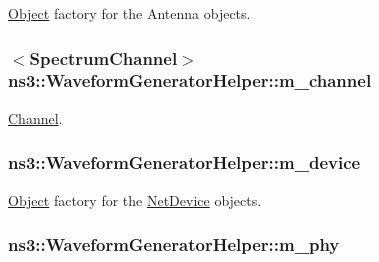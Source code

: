 \hyperlink{classns3_1_1Object}{Object} factory for the Antenna objects. 

\subsubsection[{\texorpdfstring{m\+\_\+channel}{m_channel}}]{$<${\bf Spectrum\+Channel}$>$ ns3\+::\+Waveform\+Generator\+Helper\+::m\+\_\+channel\hspace{0.3cm}{\ttfamily [protected]}}\hypertarget{classns3_1_1WaveformGeneratorHelper_a550fd32c6547a799717fadcfb90ba4a4}{}\label{classns3_1_1WaveformGeneratorHelper_a550fd32c6547a799717fadcfb90ba4a4}


\hyperlink{classns3_1_1Channel}{Channel}. 

\subsubsection[{\texorpdfstring{m\+\_\+device}{m_device}}]{ ns3\+::\+Waveform\+Generator\+Helper\+::m\+\_\+device\hspace{0.3cm}{\ttfamily [protected]}}\hypertarget{classns3_1_1WaveformGeneratorHelper_aa67df139d459938d940af894ec8e2764}{}\label{classns3_1_1WaveformGeneratorHelper_aa67df139d459938d940af894ec8e2764}


\hyperlink{classns3_1_1Object}{Object} factory for the \hyperlink{classns3_1_1NetDevice}{Net\+Device} objects. 

\subsubsection[{\texorpdfstring{m\+\_\+phy}{m_phy}}]{ ns3\+::\+Waveform\+Generator\+Helper\+::m\+\_\+phy\hspace{0.3cm}{\ttfamily [protected]}}\hypertarget{classns3_1_1WaveformGeneratorHelper_a51bae544a06afc1ec27b878655674792}{}\label{classns3_1_1WaveformGeneratorHelper_a51bae544a06afc1ec27b878655674792}


